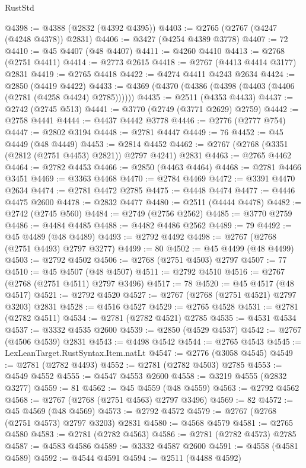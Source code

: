 \begin{lexlean}{RustStd}
\begin{coremodule}
@4398 := @4388 (@2832 (@4392 @4395))
@4403 := @2765 (@2767 (@4247 (@4248 @4378)) @2831)
@4406 := @3427 (@4254 @4389 @3778)
@4407 := 72
@4410 := @45 @4407 (@48 @4407)
@4411 := @4260 @4410
@4413 := @2768 (@2751 @4411)
@4414 := @2773 @2615
@4418 := @2767 (@4413 @4414 @3177) @2831
@4419 := @2765 @4418
@4422 := @4274 @4411 @4243 @2634
@4424 := @2850 (@4419 @4422)
@4433 := @4369 (@4370 (@4386 (@4398 (@4403 (@4406 (@2781 (@4258 @4424) @2785))))))
@4435 := @2511 (@4353 @4433)
@4437 := @2742 (@2745 @513)
@4441 := @3770 (@2749 (@3771 @2629) @2759)
@4442 := @2758 @4441
@4444 := @4437 @4442 @3778
@4446 := @2776 (@2777 @754)
@4447 := @2802 @3194
@4448 := @2781 @4447
@4449 := 76
@4452 := @45 @4449 (@48 @4449)
@4453 := @2814 @4452
@4462 := @2767 (@2768 (@3351 (@2812 (@2751 @4453) @2821)) @2797 @4241) @2831
@4463 := @2765 @4462
@4464 := @2782 @4453
@4466 := @2850 (@4463 @4464)
@4468 := @2781 @4466 @3451
@4469 := @3363 @4468
@4470 := @2784 @4469
@4472 := @3391 @4470 @2634
@4474 := @2781 @4472 @2785
@4475 := @4448 @4474
@4477 := @4446 @4475 @2600
@4478 := @2832 @4477
@4480 := @2511 (@4444 @4478)
@4482 := @2742 (@2745 @560)
@4484 := @2749 (@2756 @2562)
@4485 := @3770 @2759
@4486 := @4484 @4485
@4488 := @4482 @4486 @2562
@4489 := 79
@4492 := @45 @4489 (@48 @4489)
@4493 := @2792 @4492
@4498 := @2767 (@2768 (@2751 @4493) @2797 @3277)
@4499 := 80
@4502 := @45 @4499 (@48 @4499)
@4503 := @2792 @4502
@4506 := @2768 (@2751 @4503) @2797
@4507 := 77
@4510 := @45 @4507 (@48 @4507)
@4511 := @2792 @4510
@4516 := @2767 (@2768 (@2751 @4511) @2797 @3496)
@4517 := 78
@4520 := @45 @4517 (@48 @4517)
@4521 := @2792 @4520
@4527 := @2767 (@2768 (@2751 @4521) @2797 @3203) @2831
@4528 := @4516 @4527
@4529 := @2765 @4528
@4531 := @2781 (@2782 @4511)
@4534 := @2781 (@2782 @4521) @2785
@4535 := @4531 @4534
@4537 := @3332 @4535 @2600
@4539 := @2850 (@4529 @4537)
@4542 := @2767 (@4506 @4539) @2831
@4543 := @4498 @4542
@4544 := @2765 @4543
@4545 := LexLeanTarget.RustSyntax.Item.natLt
@4547 := @2776 (@3058 @4545)
@4549 := @2781 (@2782 @4493)
@4552 := @2781 (@2782 @4503) @2785
@4553 := @4549 @4552
@4555 := @4547 @4553 @2600
@4558 := @3219 @4555 (@2832 @3277)
@4559 := 81
@4562 := @45 @4559 (@48 @4559)
@4563 := @2792 @4562
@4568 := @2767 (@2768 (@2751 @4563) @2797 @3496)
@4569 := 82
@4572 := @45 @4569 (@48 @4569)
@4573 := @2792 @4572
@4579 := @2767 (@2768 (@2751 @4573) @2797 @3203) @2831
@4580 := @4568 @4579
@4581 := @2765 @4580
@4583 := @2781 (@2782 @4563)
@4586 := @2781 (@2782 @4573) @2785
@4587 := @4583 @4586
@4589 := @3332 @4587 @2600
@4591 := @4558 (@4581 @4589)
@4592 := @4544 @4591
@4594 := @2511 (@4488 @4592)

\end{coremodule}
\end{lexlean}

